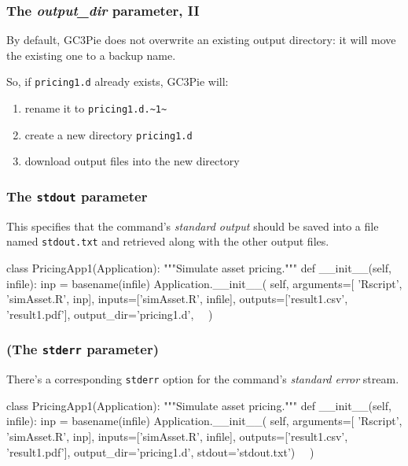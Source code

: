 \documentclass[english,serif,mathserif,xcolor=pdftex,dvipsnames,table]{beamer}
\begin{document}
\begin{frame}[fragile]
  \frametitle{The \emph{output\_dir} parameter, II}

  By default, GC3Pie does not overwrite an existing output directory:
  it will move the existing one to a backup name.

  \+
  So, if \texttt{pricing1.d} already exists, GC3Pie will:
  \begin{enumerate}
  \item rename it to \lstinline|pricing1.d.~1~|
  \item create a new directory \texttt{pricing1.d}
  \item download output files into the new directory
  \end{enumerate}
\end{frame}


\begin{frame}[fragile]
\frametitle{The \texttt{stdout} parameter}

This specifies that the command's \emph{standard output} should be
saved into a file named \texttt{stdout.txt} and retrieved along with
the other output files.

  \+
\begin{python}
class PricingApp1(Application):
  """Simulate asset pricing."""
  def __init__(self, infile):
    inp = basename(infile)
    Application.__init__(
      self,
      arguments=[
        'Rscript', 'simAsset.R', inp],
      inputs=['simAsset.R', infile],
      outputs=['result1.csv', 'result1.pdf'],
      output_dir='pricing1.d',
      ~~)
\end{python}
\end{frame}


\begin{frame}[fragile]
\frametitle{(The \texttt{stderr} parameter)}

There's a corresponding \texttt{stderr} option for the command's
\emph{standard error} stream.

\begin{python}
class PricingApp1(Application):
  """Simulate asset pricing."""
  def __init__(self, infile):
    inp = basename(infile)
    Application.__init__(
      self,
      arguments=[
        'Rscript', 'simAsset.R', inp],
      inputs=['simAsset.R', infile],
      outputs=['result1.csv', 'result1.pdf'],
      output_dir='pricing1.d',
      stdout='stdout.txt')
      ~~)
\end{python}
\end{frame}
\end{document}
